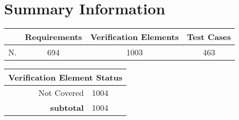 \newpage
\section{Summary Information}\label{sec:summary}
\begin{longtable}{rccc}
\toprule
 & \textbf{Requirements} & \textbf{Verification Elements} & \textbf{Test Cases} \\ \hline
N.& 694 & 1003 & 463 \\
\bottomrule
\end{longtable}
\begin{longtable}{rl}
\toprule
\multicolumn{2}{c}{\textbf{Verification Element Status}} \\ \hline
 Not Covered & 1004 \\
\hline
\textbf{subtotal} &  1004 \\
\bottomrule
\end{longtable}
